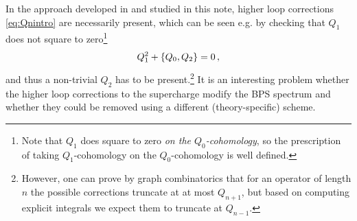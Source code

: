 \documentclass[11pt]{article}
\begin{document}
In the approach developed in \cite{Budzik:2022mpd, Budzik:2023xbr} and studied in this note, higher loop corrections \eqref{eq:Qnintro} are necessarily present, which can be seen e.g. by checking that $Q_1$ does not square to zero\footnote{Note that $Q_1$ does square to zero \textit{on the $Q_0$-cohomology}, so the prescription of taking $Q_1$-cohomology on the $Q_0$-cohomology is well defined.}
\begin{align}
    Q_1^2 + \qty{Q_0, Q_2} = 0 \, ,
\end{align}
and thus a non-trivial $Q_2$ has to be present.\footnote{However, one can prove by graph combinatorics that for an operator of length $n$ the possible corrections truncate at at most $Q_{n+1}$, but based on computing explicit integrals we expect them to truncate at $Q_{n-1}$.} It is an interesting problem whether the higher loop corrections to the supercharge modify the BPS spectrum and whether they could be removed using a different (theory-specific) scheme. 
\end{document}
